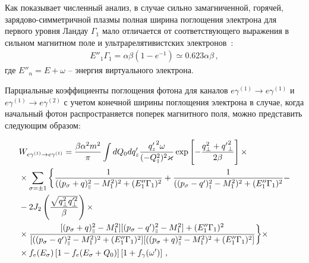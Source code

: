 Как показывает численный анализ, в 
случае сильно замагниченной, горячей, зарядово-симметричной плазмы полная 
ширина поглощения электрона для первого уровня Ландау $\Gamma_1$ мало отличается от соответствующего 
выражения в 
сильном магнитном поле и ультрарелятивистских электронов~\cite{KM_Book_2013}:
\begin{equation}
	\begin{aligned}
		E''_1\Gamma_1=\alpha \beta
		(1-e^{-1})\simeq 0.623 \alpha \beta\, ,
	\end{aligned}
\end{equation}
где $E''_n=E+\omega$ -- энергия виртуального электрона.

 Парциальные коэффициенты поглощения фотона для каналов $e \gamma^{(1)} \to 
 e\gamma^{(1)}$ и $e \gamma^{(1)} \to e\gamma^{(2)}$ с учетом конечной ширины 
 поглощения электрона в случае, когда начальный фотон 
 распространяется поперек магнитного поля, можно представить следующим образом:


\begin{equation}
	\begin{aligned}\label{Wres}
		&W_{e\gamma^{(1)}\to e\gamma^{(1)}}=\frac{\beta\alpha^2m^2}{\pi} \int 
		dQ_0dq'_z \frac{{q_z'}^2\omega } 
		{(-Q_{\mbox{\tiny $\|$}}^2)^2\varkappa}\exp\left[-\frac{q_\perp^2+{q'}_\perp^2}{2\beta}\right]\times
		\\
		\nonumber&\times\sum_{\sigma=\pm 1}\bigg\{
		\frac{1}{((p_\sigma+q)_{\mbox{\tiny $\|$}}^2-M_1^2)^2+(E''_1\Gamma_1)^2}  +\frac{1}{((p_\sigma-q')_{\mbox{\tiny $\|$}}^2-M_1^2)^2+(E''_1\Gamma_1)^2}-
		\\
		\nonumber&-2 J_{2}\left(\frac{\sqrt{q_\perp^2 q_\perp'^2}}{\beta}\right)\times\\
		\nonumber&\times\frac{[(p_\sigma+q)^2_{\mbox{\tiny $\|$}}-M_1^2][(p_\sigma-q')^2_{\mbox{\tiny $\|$}}-M^2_{1}]+(E''_1\Gamma_{1})^2}{[((p_\sigma-q')_{\mbox{\tiny $\|$}}^2-M_1^2)^2+(E''_1\Gamma_1)^2][((p_\sigma+q)_{\mbox{\tiny $\|$}}^2-M_{1}^2)^2+(E''_1\Gamma_{1})^2]}
		\bigg\}\times
		\\\nonumber&\times 
		f_e{(E_\sigma)}\left[1-f_e{(E_\sigma+Q_0)}\right]\left[1+f_\gamma(\omega')\right]
		\, ,
	\end{aligned}
\end{equation}

